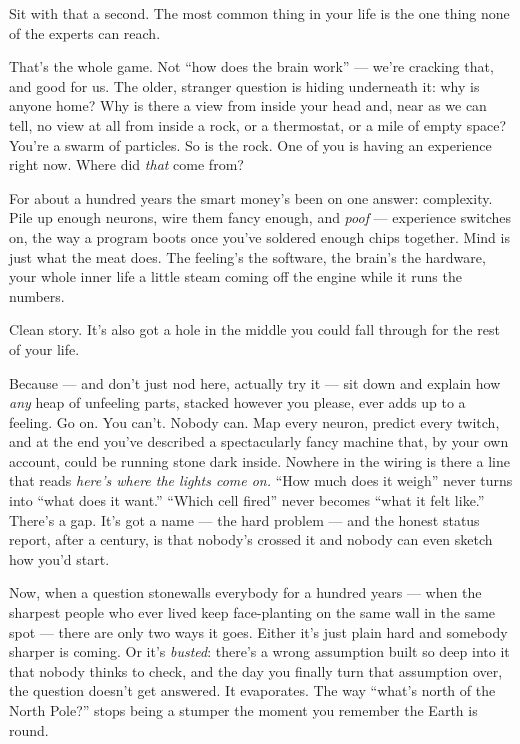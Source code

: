 \documentclass[11pt,openany]{book}
\begin{document}
Sit with that a second. The most common thing in your life is the one thing none of the experts can reach.

That’s the whole game. Not “how does the brain work” — we’re cracking that, and good for us. The older, stranger question is hiding underneath it: why is anyone home? Why is there a view from inside your head and, near as we can tell, no view at all from inside a rock, or a thermostat, or a mile of empty space? You’re a swarm of particles. So is the rock. One of you is having an experience right now. Where did \textit{that} come from?

For about a hundred years the smart money’s been on one answer: complexity. Pile up enough neurons, wire them fancy enough, and \textit{poof} — experience switches on, the way a program boots once you’ve soldered enough chips together. Mind is just what the meat does. The feeling’s the software, the brain’s the hardware, your whole inner life a little steam coming off the engine while it runs the numbers.

Clean story. It’s also got a hole in the middle you could fall through for the rest of your life.

Because — and don’t just nod here, actually try it — sit down and explain how \textit{any} heap of unfeeling parts, stacked however you please, ever adds up to a feeling. Go on. You can’t. Nobody can. Map every neuron, predict every twitch, and at the end you’ve described a spectacularly fancy machine that, by your own account, could be running stone dark inside. Nowhere in the wiring is there a line that reads \textit{here’s where the lights come on.} “How much does it weigh” never turns into “what does it want.” “Which cell fired” never becomes “what it felt like.” There’s a gap. It’s got a name — the hard problem — and the honest status report, after a century, is that nobody’s crossed it and nobody can even sketch how you’d start.

Now, when a question stonewalls everybody for a hundred years — when the sharpest people who ever lived keep face-planting on the same wall in the same spot — there are only two ways it goes. Either it’s just plain hard and somebody sharper is coming. Or it’s \textit{busted}: there’s a wrong assumption built so deep into it that nobody thinks to check, and the day you finally turn that assumption over, the question doesn’t get answered. It evaporates. The way “what’s north of the North Pole?” stops being a stumper the moment you remember the Earth is round.
\end{document}

